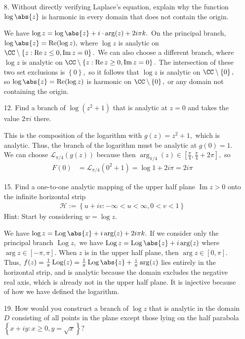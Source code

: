 \documentclass{article}
\DeclareMathOperator{\re}{Re}
\DeclareMathOperator{\im}{Im}
\DeclareMathOperator{\Log}{Log}
\begin{document}
\begin{itemize}
	\item[8.] Without directly verifying Laplace's equation, explain why the function $\log\abs{z}$ is harmonic in every domain that does not contain the origin.
		\begin{answer*}
			We have $\log z = \log\abs{z} + i\cdot\arg(z) + 2i\pi k.$ On the principal branch, $\log\abs{z}=\re(\log z),$ where $\log z$ is analytic on $\CC\setminus\left\{ z:\re z\le 0, \im z = 0 \right\}.$ We can also choose a different branch, where $\log z$ is analytic on $\CC\setminus\left\{ z:\re z \ge 0, \im z = 0 \right\}.$ The intersection of these two set exclusions is $\left\{ 0 \right\},$ so it follows that $\log z$ is analytic on $\CC\setminus\left\{ 0 \right\},$ so $\log\abs{z}=\re (\log z)$ is harmonic on $\CC\setminus\left\{ 0 \right\},$ or any domain not containing the origin.
		\end{answer*}

	\item[12.] Find a branch of $\log(z^2+1)$ that is analytic at $z=0$ and takes the value $2\pi i$ there.
		\begin{soln}
			This is the composition of the logarithm with $g(z)=z^2+1,$ which is analytic. Thus, the branch of the logarithm must be analytic at $g(0)=1.$ We can choose $\mathcal L_{\pi/4}(g(z))$ because then $\arg_{\pi/4}(z)\in\left[ \frac{\pi}{4}, \frac{\pi}{4}+2\pi \right],$ so
			\begin{align*}
				F(0) &= \mathcal L_{\pi/4}(0^2+1) = \log 1 + 2i\pi = 2i\pi
			\end{align*}
		\end{soln}
		
	\item[15.] Find a one-to-one analytic mapping of the upper half plane $\im z>0$ onto the infinite horizontal strip
		\begin{align*}
			\mathcal H:=\left\{ u+iv:-\infty<u<\infty, 0<v<1 \right\}
		\end{align*}
		Hint: Start by considering $w=\log z.$
		\begin{soln}
			We have $\log z = \Log\abs{z} + i\arg(z) + 2i\pi k.$ If we consider only the principal branch $\Log z,$ we have $\Log z = \Log \abs{z} + i\arg(z)$ where $\arg z\in[-\pi, \pi].$ When $z$ is in the upper half plane, then $\arg z\in[0, \pi].$ Thus, $f(z) = \frac{1}{\pi} \Log(z) = \frac{1}{\pi}\Log\abs{z} + \frac{i}{\pi}\arg(z)$ lies entirely in the horizontal strip, and is analytic because the domain excludes the negative real axis, which is already not in the upper half plane. It is injective because of how we have defined the logarithm.
		\end{soln}

	\item[19.] How would you construct a branch of $\log z$ that is analytic in the domain $D$ consisting of all points in the plane except those lying on the half parabola $\left\{ x+iy: x\ge 0, y=\sqrt{x} \right\}?$
		
\end{itemize}
\end{document}

